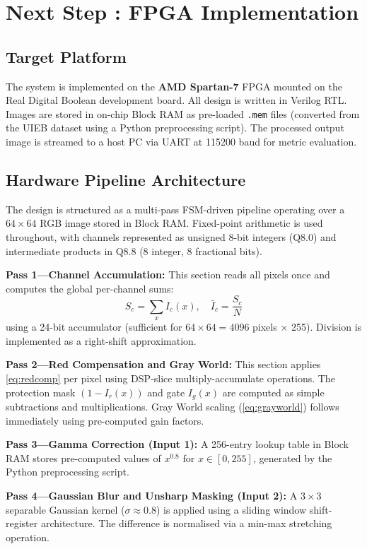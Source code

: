 \documentclass[10pt,twocolumn,letterpaper]{article}
\begin{document}
\section{Next Step : FPGA Implementation}
\label{sec:fpga}

\subsection{Target Platform}

The system is implemented on the \textbf{AMD Spartan-7} FPGA
mounted on the Real Digital Boolean development board. All design is written
in Verilog RTL. Images are stored in on-chip Block RAM as pre-loaded
\texttt{.mem} files (converted from the UIEB dataset using a Python
preprocessing script). The processed output image is streamed to a host
PC via UART at 115200 baud for metric evaluation.

\subsection{Hardware Pipeline Architecture}

The design is structured as a multi-pass FSM-driven pipeline operating over
a $64\times64$ RGB image stored in Block RAM. Fixed-point arithmetic is
used throughout, with channels represented as unsigned 8-bit integers
(Q8.0) and intermediate products in Q8.8 (8 integer, 8 fractional bits).

\textbf{Pass 1---Channel Accumulation:} This section 
reads all pixels once and computes the global per-channel sums:
\begin{equation}
  S_c = \sum_{x} I_c(x), \quad \bar{I}_c = \frac{S_c}{N}
\end{equation}
using a 24-bit accumulator (sufficient for $64 \times 64 = 4096$ pixels
$\times$ 255). Division is implemented as a right-shift approximation.

\textbf{Pass 2---Red Compensation and Gray World:}
This section applies \cref{eq:redcomp} per pixel using
DSP-slice multiply-accumulate operations. The protection mask
$(1-I_r(x))$ and gate $I_g(x)$ are computed as simple subtractions and
multiplications. Gray World scaling (\cref{eq:grayworld}) follows
immediately using pre-computed gain factors.

\textbf{Pass 3---Gamma Correction (Input 1):} A 256-entry lookup table in
Block RAM stores pre-computed values of $x^{0.8}$ for $x \in [0,255]$,
generated by the Python preprocessing script.

\textbf{Pass 4---Gaussian Blur and Unsharp Masking (Input 2):} A $3\times3$
separable Gaussian kernel ($\sigma \approx 0.8$) is applied using a sliding
window shift-register architecture. The difference is normalised via a
min-max stretching operation.
\end{document}
